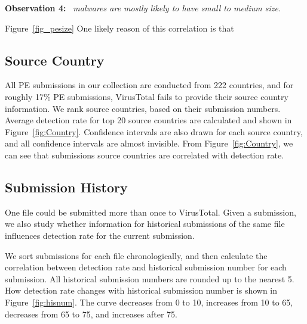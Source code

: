 {\bf Observation 4:} 
{\em \pe\ malwares are mostly likely to have small to medium size.}

Figure~\ref{fig_pesize}
One likely reason of this correlation is that  

\subsection{Source Country}
\label{sec:country}

All PE submissions in our collection are conducted from 222 countries, 
and for roughly 17\% PE submissions, 
VirusTotal fails to provide their source country information. 
We rank source countries, based on their submission numbers. 
Average detection rate for top 20 source countries are calculated and shown in 
Figure~\ref{fig:Country}. 
Confidence intervals are also drawn for each source country, 
and all confidence intervals are almost invisible. 
From Figure~\ref{fig:Country}, 
we can see that submissions source countries are correlated with detection rate.

\fi


\subsection{Submission History}
\label{sec:history}



One file could be submitted more than once to VirusTotal. 
Given a submission, we also study whether information for historical 
submissions of the same file influences detection rate for the current submission. 

We sort submissions for each file chronologically, 
and then calculate the correlation between detection rate and historical submission number for each submission. 
All historical submission numbers are rounded up to the nearest 5. 
How detection rate changes with historical submission number is shown in Figure~\ref{fig:hisnum}. 
The curve decreases from 0 to 10, increases from 10 to 65, decreases from 65 to 75, and increases after 75. 


